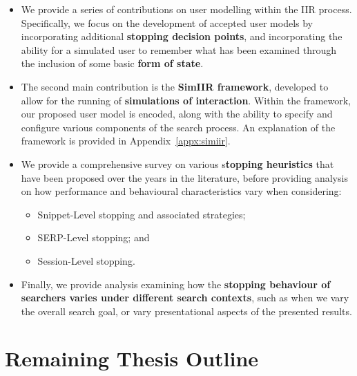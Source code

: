 \begin{itemize}
    \item[\blueboxbold{C1}]{We provide a series of contributions on user modelling within the IIR process. Specifically, we focus on the development of accepted user models by incorporating additional \textbf{stopping decision points}, and incorporating the ability for a simulated user to remember what has been examined through the inclusion of some basic \textbf{form of state}.}

    \item[\blueboxbold{C2}]{The second main contribution is the \textbf{SimIIR framework}, developed to allow for the running of \textbf{simulations of interaction}. Within the framework, our proposed user model is encoded, along with the ability to specify and configure various components of the search process. An explanation of the framework is provided in Appendix~\ref{appx:simiir}.}

    \item[\blueboxbold{C3}]{We provide a comprehensive survey on various s\textbf{topping heuristics} that have been proposed over the years in the literature, before providing analysis on how performance and behavioural characteristics vary when considering:}

    \begin{itemize}
        \item{Snippet-Level stopping and associated strategies;}
        \item{SERP-Level stopping; and}
        \item{Session-Level stopping.}
    \end{itemize}

    \item[\blueboxbold{C4}]{Finally, we provide analysis examining how the \textbf{stopping behaviour of searchers varies under different search contexts}, such as when we vary the overall search goal, or vary presentational aspects of the presented results.}

\end{itemize}

\section{Remaining Thesis Outline}

